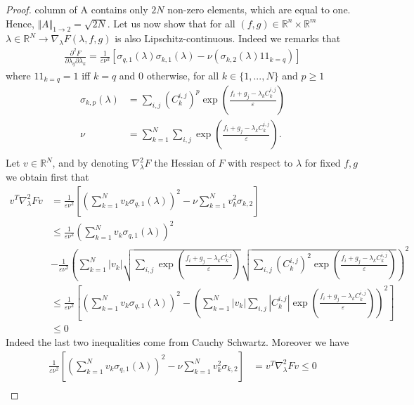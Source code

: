 \begin{proof}
column of A contains only $2N$ non-zero elements, which
are equal to one. Hence, $\Vert A\Vert_{1\rightarrow 2} = \sqrt{2N}$. Let us now show that for all $(f,g)\in\mathbb{R}^n\times\mathbb{R}^m $ $\lambda\in\mathbb{R}^N \rightarrow \nabla_{\lambda} F(\lambda,f,g)$ is also Lipschitz-continuous. Indeed we remarks that 
\begin{align*}
    \frac{\partial^2 F}{\partial\lambda_q\partial\lambda_k} = \frac{1}{\varepsilon\nu^2}\left[\sigma_{q,1}(\lambda)\sigma_{k,1}(\lambda) - \nu (\sigma_{k,2}(\lambda)1\!\!1_{k=q})\right]
\end{align*}
where $1\!\!1_{k=q}=1$ iff $k=q$ and 0 otherwise, for all $k\in\{1,...,N\}$ and $p\geq 1$
\begin{align*}
    \sigma_{k,p}(\lambda) &= \sum_{i,j} (C_k^{i,j})^p \exp\left(\frac{f_i + g_j-\lambda_k C_k^{i,j}}{\varepsilon}\right) \\
    \nu &= \sum_{k=1}^N \sum_{i,j} \exp\left(\frac{f_i + g_j-\lambda_k C_k^{i,j}}{\varepsilon}\right).\\
\end{align*}
Let $v\in\mathbb{R}^N$, and by denoting $\nabla^2_{\lambda}F$ the Hessian of $F$ with respect to $\lambda$ for fixed $f,g$ we obtain first that 
\begin{align*}
  v^T \nabla^2_{\lambda}F v &=\frac{1}{\varepsilon\nu^2} \left[ \left(\sum_{k=1}^N v_k \sigma_{q,1}(\lambda)\right)^2 -\nu \sum_{k=1}^N v_k^2 \sigma_{k,2}\right]\\
  &\leq \frac{1}{\varepsilon\nu^2}\left(\sum_{k=1}^N v_k \sigma_{q,1}(\lambda)\right)^2 \\
  &-\frac{1}{\varepsilon\nu^2} \left(\sum_{k=1}^N |v_k| \sqrt{\sum_{i,j} \exp\left(\frac{f_i + g_j-\lambda_k C_k^{i,j}}{\varepsilon}\right)}  \sqrt{\sum_{i,j} (C_k^{i,j})^2 \exp\left(\frac{f_i + g_j-\lambda_k C_k^{i,j}}{\varepsilon}\right)} \right)^2 \\
  &\leq \frac{1}{\varepsilon\nu^2}\left[\left(\sum_{k=1}^N v_k \sigma_{q,1}(\lambda)\right)^2- \left(\sum_{k=1}^N |v_k| \sum_{i,j}  |C_k^{i,j}| \exp\left(\frac{f_i + g_j-\lambda_k C_k^{i,j}}{\varepsilon}\right)\right)^2\right]\\
  &\leq 0
 \end{align*}
Indeed the last two inequalities come from Cauchy Schwartz. Moreover we have
\begin{align*}
 \frac{1}{\varepsilon\nu^2} \left[ \left(\sum_{k=1}^N v_k \sigma_{q,1}(\lambda)\right)^2 -\nu \sum_{k=1}^N v_k^2 \sigma_{k,2}\right] & = v^T \nabla^2_{\lambda}F v \leq 0   \\

\end{align*}
\end{proof}
